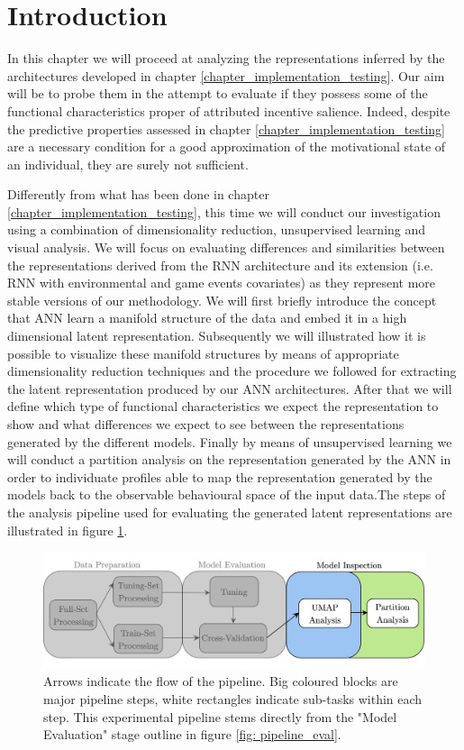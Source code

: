 \section{Introduction}
\label{representation_analysis_introduction}
In this chapter we will proceed at analyzing the representations inferred by the architectures developed in chapter \ref{chapter_implementation_testing}. Our aim will be to probe them in the attempt to evaluate if they possess some of the functional characteristics proper of attributed incentive salience. Indeed, despite the predictive properties assessed in chapter \ref{chapter_implementation_testing} are a necessary condition for a good approximation of the motivational state  of an individual, they are surely not sufficient. 

Differently from what has been done in chapter \ref{chapter_implementation_testing}, this time we will conduct our investigation using  a combination of dimensionality reduction, unsupervised learning and visual analysis. We will focus on evaluating differences and similarities between the representations derived from the RNN architecture and its extension (i.e. RNN with environmental and game events covariates) as they represent more stable versions of our methodology. We will first briefly introduce the concept that ANN learn a manifold structure of the data and embed it in a high dimensional latent representation. Subsequently we will illustrated how it is possible to visualize these manifold structures by means of appropriate dimensionality reduction techniques and the procedure we followed for extracting the latent representation produced by our ANN architectures. After that we will define which type of functional characteristics we expect the representation to show and what differences we expect to see between the representations generated by the different models. Finally by means of unsupervised learning we will conduct a partition analysis on the representation generated by the ANN in order to individuate profiles able to map the representation generated by the models back to the observable behavioural space of the input data.The steps of the analysis pipeline used for evaluating the generated latent representations are illustrated in figure \ref{fig: pipeline_inspect}.
\begin{figure}[h]
  \centering
  \includegraphics[width=\textwidth]{images/chapter_4/pipeline_inspect.png}
    \caption[\textbf{Representation analysis experimental pipeline}]{Arrows indicate the flow of the pipeline. Big coloured blocks are major pipeline steps, white rectangles indicate sub-tasks within each step. This experimental pipeline stems directly from the "Model Evaluation" stage outline in figure \ref{fig: pipeline_eval}.}
    \label{fig: pipeline_inspect}
\end{figure}

